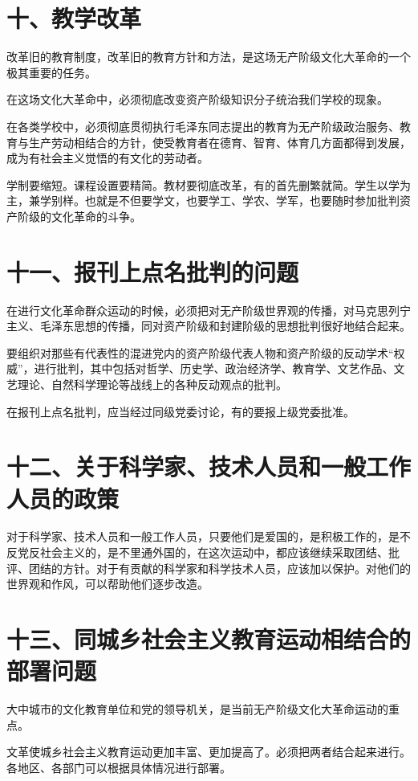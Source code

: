 \section{十、教学改革}

改革旧的教育制度，改革旧的教育方针和方法，是这场无产阶级文化大革命的一个极其重要的任务。

在这场文化大革命中，必须彻底改变资产阶级知识分子统治我们学校的现象。

在各类学校中，必须彻底贯彻执行毛泽东同志提出的教育为无产阶级政治服务、教育与生产劳动相结合的方针，使受教育者在德育、智育、体育几方面都得到发展，成为有社会主义觉悟的有文化的劳动者。

学制要缩短。课程设置要精简。教材要彻底改革，有的首先删繁就简。学生以学为主，兼学别样。也就是不但要学文，也要学工、学农、学军，也要随时参加批判资产阶级的文化革命的斗争。

\section{十一、报刊上点名批判的问题}

在进行文化革命群众运动的时候，必须把对无产阶级世界观的传播，对马克思列宁主义、毛泽东思想的传播，同对资产阶级和封建阶级的思想批判很好地结合起来。

要组织对那些有代表性的混进党内的资产阶级代表人物和资产阶级的反动学术“权威”，进行批判，其中包括对哲学、历史学、政治经济学、教育学、文艺作品、文艺理论、自然科学理论等战线上的各种反动观点的批判。

在报刊上点名批判，应当经过同级党委讨论，有的要报上级党委批准。

\section{十二、关于科学家、技术人员和一般工作人员的政策}

对于科学家、技术人员和一般工作人员，只要他们是爱国的，是积极工作的，是不反党反社会主义的，是不里通外国的，在这次运动中，都应该继续采取团结、批评、团结的方针。对于有贡献的科学家和科学技术人员，应该加以保护。对他们的世界观和作风，可以帮助他们逐步改造。

\section{十三、同城乡社会主义教育运动相结合的部署问题}

大中城市的文化教育单位和党的领导机关，是当前无产阶级文化大革命运动的重点。

文革使城乡社会主义教育运动更加丰富、更加提高了。必须把两者结合起来进行。各地区、各部门可以根据具体情况进行部署。

